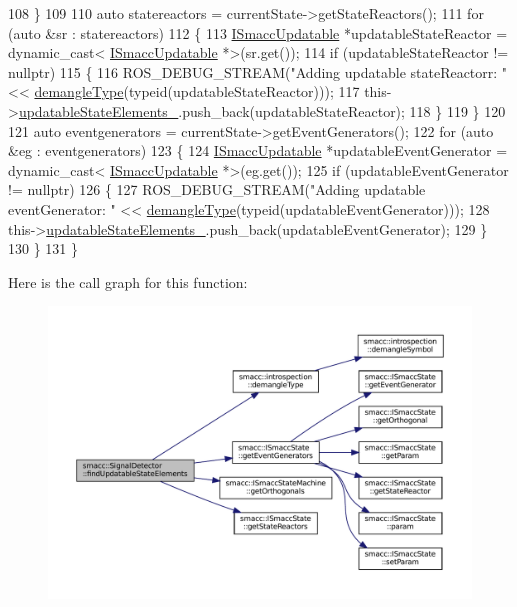 \begin{DoxyCode}
108         \}
109 
110         \textcolor{keyword}{auto} statereactors = currentState->getStateReactors();
111         \textcolor{keywordflow}{for} (\textcolor{keyword}{auto} &sr : statereactors)
112         \{
113             \hyperlink{classISmaccUpdatable}{ISmaccUpdatable} *updatableStateReactor = \textcolor{keyword}{dynamic\_cast<}
      \hyperlink{classISmaccUpdatable}{ISmaccUpdatable} *\textcolor{keyword}{>}(sr.get());
114             \textcolor{keywordflow}{if} (updatableStateReactor != \textcolor{keyword}{nullptr})
115             \{
116                 ROS\_DEBUG\_STREAM(\textcolor{stringliteral}{"Adding updatable stateReactorr: "} << 
      \hyperlink{namespacesmacc_1_1introspection_a670e39ccea29952859df4e2d0e45077b}{demangleType}(\textcolor{keyword}{typeid}(updatableStateReactor)));
117                 this->\hyperlink{classsmacc_1_1SignalDetector_a07a5e7bb00c348435d954e22682fa610}{updatableStateElements\_}.push\_back(updatableStateReactor);
118             \}
119         \}
120 
121         \textcolor{keyword}{auto} eventgenerators = currentState->getEventGenerators();
122         \textcolor{keywordflow}{for} (\textcolor{keyword}{auto} &eg : eventgenerators)
123         \{
124             \hyperlink{classISmaccUpdatable}{ISmaccUpdatable} *updatableEventGenerator = \textcolor{keyword}{dynamic\_cast<}
      \hyperlink{classISmaccUpdatable}{ISmaccUpdatable} *\textcolor{keyword}{>}(eg.get());
125             \textcolor{keywordflow}{if} (updatableEventGenerator != \textcolor{keyword}{nullptr})
126             \{
127                 ROS\_DEBUG\_STREAM(\textcolor{stringliteral}{"Adding updatable eventGenerator: "} << 
      \hyperlink{namespacesmacc_1_1introspection_a670e39ccea29952859df4e2d0e45077b}{demangleType}(\textcolor{keyword}{typeid}(updatableEventGenerator)));
128                 this->\hyperlink{classsmacc_1_1SignalDetector_a07a5e7bb00c348435d954e22682fa610}{updatableStateElements\_}.push\_back(updatableEventGenerator);
129             \}
130         \}
131     \}
\end{DoxyCode}
Here is the call graph for this function\+:
\nopagebreak
\begin{figure}[H]
\begin{center}
\leavevmode
\includegraphics[width=350pt]{classsmacc_1_1SignalDetector_a443234ebdf8cedd45cde725e64639dfe_cgraph}
\end{center}
\end{figure}
